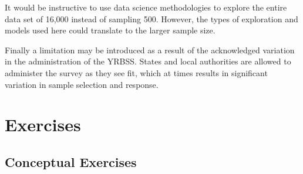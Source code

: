 \documentclass[
]{krantz}
\begin{document}
It would be instructive to use data science methodologies to explore the entire data set of 16,000 instead of sampling 500. However, the types of exploration and models used here could translate to the larger sample size.

Finally a limitation may be introduced as a result of the acknowledged variation in the administration of the YRBSS. States and local authorities are allowed to administer the survey as they see fit, which at times results in significant variation in sample selection and response.

\section{Exercises}\label{exercises-5}

\subsection{Conceptual Exercises}\label{conceptual-exercises-3}
\end{document}
